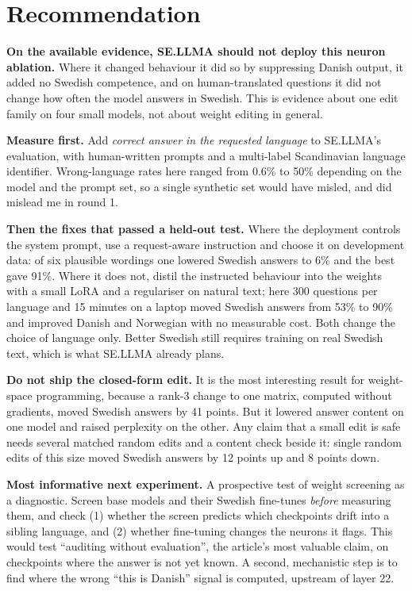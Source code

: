 \documentclass[10pt,a4paper]{article}
\begin{document}
\section{Recommendation}

\textbf{On the available evidence, SE.LLMA should not deploy this neuron ablation.} Where it changed behaviour it did so by suppressing Danish output, it added no Swedish competence, and on human-translated questions it did not change how often the model answers in Swedish. This is evidence about one edit family on four small models, not about weight editing in general.

\textbf{Measure first.} Add \emph{correct answer in the requested language} to SE.LLMA's evaluation, with human-written prompts and a multi-label Scandinavian language identifier. Wrong-language rates here ranged from 0.6\% to 50\% depending on the model and the prompt set, so a single synthetic set would have misled, and did mislead me in round 1.

\textbf{Then the fixes that passed a held-out test.} Where the deployment controls the system prompt, use a request-aware instruction and choose it on development data: of six plausible wordings one lowered Swedish answers to 6\% and the best gave 91\%. Where it does not, distil the instructed behaviour into the weights with a small LoRA and a regulariser on natural text; here 300 questions per language and 15 minutes on a laptop moved Swedish answers from 53\% to 90\% and improved Danish and Norwegian with no measurable cost. Both change the choice of language only. Better Swedish still requires training on real Swedish text, which is what SE.LLMA already plans.

\textbf{Do not ship the closed-form edit.} It is the most interesting result for weight-space programming, because a rank-3 change to one matrix, computed without gradients, moved Swedish answers by 41 points. But it lowered answer content on one model and raised perplexity on the other. Any claim that a small edit is safe needs several matched random edits and a content check beside it: single random edits of this size moved Swedish answers by 12 points up and 8 points down.

\textbf{Most informative next experiment.} A prospective test of weight screening as a diagnostic. Screen base models and their Swedish fine-tunes \emph{before} measuring them, and check (1) whether the screen predicts which checkpoints drift into a sibling language, and (2) whether fine-tuning changes the neurons it flags.
This would test ``auditing without evaluation'', the article's most valuable claim, on checkpoints where the answer is not yet known. A second, mechanistic step is to find where the wrong ``this is Danish'' signal is computed, upstream of layer 22.
\end{document}
